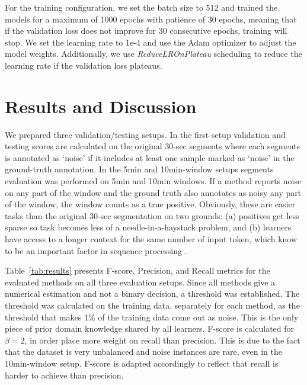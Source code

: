 \documentclass[runningheads]{llncs}
\begin{document}
For the training configuration, we set the batch size to 512 and
trained the models for a maximum of 1000 epochs with patience of 30
epochs, meaning that if the validation loss does not improve for 30
consecutive epochs, training will stop. We set the learning rate to
1e-4 and use the Adam optimizer to adjust the model
weights. Additionally, we use \emph{ReduceLROnPlateau} scheduling to
reduce the learning rate if the validation loss plateaus.


\section{Results and Discussion}
\label{sec:results}

We prepared three validation/testing setups. In the first setup
validation and testing scores are calculated on the original 30-sec
segments where each segments is annotated as `noise' if it includes at
least one sample marked as `noise' in the ground-truth annotation.
In the 5min and 10min-window setups segments evaluation was performed
on 5min and 10min windows. If a method reports noise on any part of
the window and the ground truth also annotates as noisy any part of the
window, the window counts as a true positive. Obviously, these are
easier tasks than the original 30-sec segmentation on two
grounds: (a) positives get less sparse so task becomes less of a
needle-in-a-haystack problem, and (b) learners have access to a longer
context for the same number of input token, which know to be an
important factor in sequence processing \cite{Lee_2021}.



Table~\ref{tab:results} presents F-score, Precision, and Recall
metrics for the evaluated methods on all three evaluation setups.
%
Since all methods give a numerical estimation and not a binary
decision, a threshold was established. The threshold was calculated
on the training data, separately for each method,
as the threshold that makes 1\% of the training data come out
as noise. This is the only piece of prior domain knowledge shared by
all learners.
%
F-score is calculated for $\beta=2$, in order place
more weight on recall than precision. This is due to the fact that
the dataset is very unbalanced and noise instances are rare, even in
the 10min-window setup. F-score is adapted accordingly to reflect
that recall is harder to achieve than precision.

\end{document}
